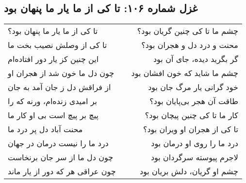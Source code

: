 \begin{center}
\section*{غزل شماره ۱۰۶: تا کی از ما یار ما پنهان بود}
\label{sec:106}
\begin{longtable}{l p{0.5cm} r}
تا کی از ما یار ما پنهان بود؟
&&
چشم ما تا کی چنین گریان بود؟
\\
تا کی از وصلش نصیب بخت ما
&&
محنت و درد دل و هجران بود؟
\\
این چنین کز یار دور افتاده‌ام
&&
گر بگرید دیده، جای آن بود
\\
چون دل ما خون شد از هجران او
&&
چشم ما شاید که خون افشان بود
\\
از فراقش دل ز جان آمد به جان
&&
خود گرانی یار مرگ جان بود
\\
بر امیدی زنده‌ام، ورنه که را
&&
طاقت آن هجر بی‌پایان بود؟
\\
پیچ بر پیچ است بی او کار ما
&&
کار ما تا کی چنین پیچان بود؟
\\
محنت آباد دل پر درد ما
&&
تا کی از هجران او ویران بود؟
\\
درد ما را نیست درمان در جهان
&&
درد ما را روی او درمان بود
\\
چون دل ما از سر جان برنخاست
&&
لاجرم پیوسته سرگردان بود
\\
چون عراقی هر که دور از یار ماند
&&
چشم او گریان، دلش بریان بود
\\
\end{longtable}
\end{center}
